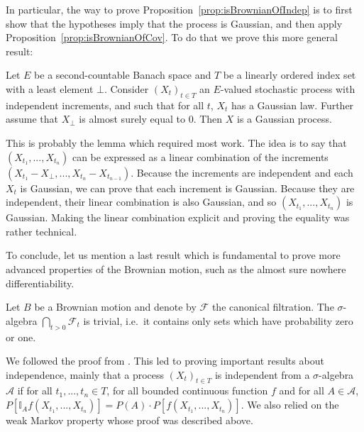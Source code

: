 \documentclass[lean]{Draft}
\makeatletter
\newcommand\leanlink{\begingroup\catcode`\#=12\relax\@leanlink}
\newcommand\@leanlink[2]{\endgroup
\href{#1}
{\texttt{\detokenize{#2}}}}
\newcommand{\mllink}[3]{%
\leanlink{https://github.com/leanprover-community/mathlib4/blob/6135ffb78e8bcd3fcc8ec02f3f82ea0b0737358b/Mathlib/#1.lean\##2}
{#3}}
\makeatother
\begin{document}
In particular, the way to prove Proposition~\ref{prop:isBrownianOfIndep} is to first show that the hypotheses imply that the process is Gaussian, and then apply Proposition~\ref{prop:isBrownianOfCov}. To do that we prove this more general result:

\begin{lemma}[\mllink{Probability/Independence/Process/HasIndepIncrements/IsGaussianProcess}{L113-L120}{ProbabilityTheory.HasIndepIncrements.isGaussianProcess}]
Let $E$ be a second-countable Banach space and $T$ be a linearly ordered index set with a least element $\bot$. Consider $(X_t)_{t \in T}$ an $E$-valued stochastic process with independent increments, and such that for all $t$, $X_t$ has a Gaussian law. Further assume that $X_\bot$ is almost surely equal to $0$. Then $X$ is a Gaussian process.
\end{lemma}

This is probably the lemma which required most work. The idea is to say that $(X_{t_1}, ..., X_{t_n})$ can be expressed as a linear combination of the increments $(X_{t_1} - X_\bot, ..., X_{t_n} - X_{t_{n-1}})$. Because the increments are independent and each $X_t$ is Gaussian, we can prove that each increment is Gaussian. Because they are independent, their linear combination is also Gaussian, and so $(X_{t_1}, ..., X_{t_n})$ is Gaussian. Making the linear combination explicit and proving the equality was rather technical.

To conclude, let us mention a last result which is fundamental to prove more advanced properties of the Brownian motion, such as the almost sure nowhere differentiability.

\begin{proposition}
Let $B$ be a Brownian motion and denote by $\mathcal{F}$ the canonical filtration. The $\sigma$-algebra $\bigcap_{t > 0} \mathcal{F}_t$ is trivial, i.e.\ it contains only sets which have probability zero or one.
\end{proposition}

We followed the proof from \cite{LeGall2016}. This led to proving important results about independence, mainly that a process $(X_t)_{t \in T}$ is independent from a $\sigma$-algebra $\mathcal{A}$ if for all $t_1, ..., t_n \in T$, for all bounded continuous function $f$ and for all $A \in \mathcal{A}$, $P[\mathbb{I}_A f(X_{t_1}, ..., X_{t_n})] = P(A) \cdot P[f(X_{t_1}, ..., X_{t_n})]$. We also relied on the weak Markov property whose proof was described above.
\end{document}
